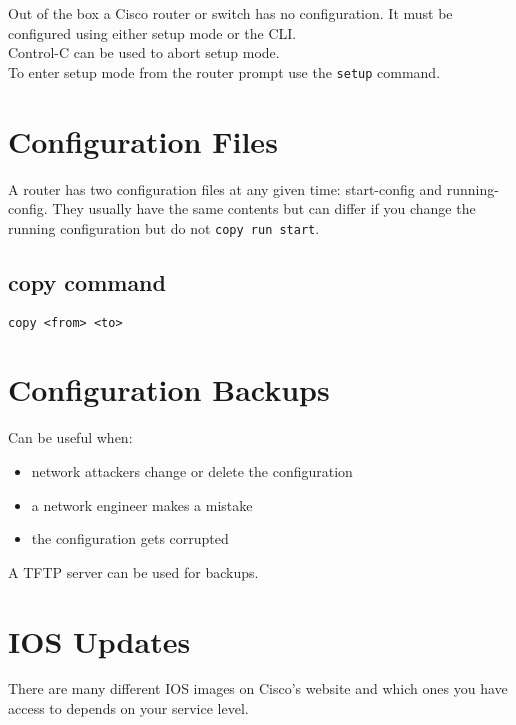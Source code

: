 \documentclass{article}
\begin{document}
Out of the box a Cisco router or switch has no configuration. It must
be configured using either setup mode or the CLI.\\

Control-C can be used to abort setup mode.\\

To enter setup mode from the router prompt use the \texttt{setup} command.\\

\section{Configuration Files}

A router has two configuration files at any given time: start-config and
running-config. They usually have the same contents but can differ if you
change the running configuration but do not \texttt{copy run start}.\\

\subsection{copy command}

\texttt{copy <from> <to>}

\section{Configuration Backups}

Can be useful when:

\begin{itemize}

\item network attackers change or delete the configuration
\item a network engineer makes a mistake
\item the configuration gets corrupted

\end{itemize}

A TFTP server can be used for backups.\\

\section{IOS Updates}

There are many different IOS images on Cisco's website and which ones you have
access to depends on your service level.\\
\end{document}
